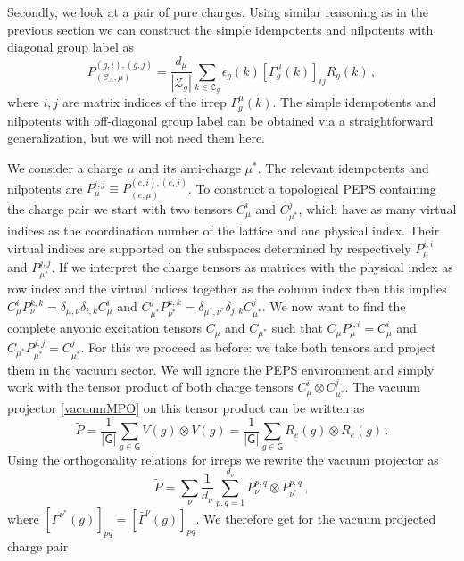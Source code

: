 \documentclass[12 pt]{article}
\begin{document}
Secondly, we look at a pair of pure charges. Using similar reasoning as in the previous section we can construct the simple idempotents and nilpotents with diagonal group label as
\begin{equation}
    P_{(\mathcal{C}_A,\mu)}^{(g,i),(g,j)} =  \frac{d_\mu}{|\mathcal{Z}_g|}\sum_{k\in\mathcal{Z}_g} \epsilon_g(k) [\Gamma^\mu_g(k)]_{ij}R_g(k)\, ,
\end{equation}
where $i,j$ are matrix indices of the irrep $\Gamma^\mu_g(k)$. The simple idempotents and nilpotents with off-diagonal group label can be obtained via a straightforward generalization, but we will not need them here.

We consider a charge $\mu$ and its anti-charge $\mu^*$. The relevant idempotents and nilpotents are $P_{\mu}^{i,j} \equiv P_{(e,\mu)}^{(e,i),(e,j)}$. To construct a topological PEPS containing the charge pair we start with two tensors $C^i_\mu$ and $C^j_{\mu^*}$, which have as many virtual indices as the coordination number of the lattice and one physical index. Their virtual indices are supported on the subspaces determined by respectively $P_\mu^{i,i}$ and $P_{\mu^*}^{j,j}$. If we interpret the charge tensors as matrices with the physical index as row index and the virtual indices together as the column index then this implies $C^i_\mu P^{k,k}_\nu = \delta_{\mu,\nu}\delta_{i,k}C^i_\mu$ and $C^j_{\mu^*} P^{k,k}_{\nu^*} = \delta_{\mu^*,\nu^*}\delta_{j,k} C^j_{\mu^*}$. We now want to find the complete anyonic excitation tensors $C_\mu$ and $C_{\mu^*}$ such that $C_\mu P_\mu^{i,i} = C_\mu^i$ and $C_{\mu^*}P_{\mu^*}^{j,j} = C^j_{\mu^*}$. For this we proceed as before: we take both tensors and project them in the vacuum sector. We will ignore the PEPS environment and simply work with the tensor product of both charge tensors $C_\mu^i\otimes C_{\mu^*}^j$. The vacuum projector \eqref{vacuumMPO} on this tensor product can be written as
\begin{equation}
    \tilde{P} = \frac{1}{|\mathsf{G}|}\sum_{g\in \mathsf{G}} V(g)\otimes V(g) = \frac{1}{|\mathsf{G}|}\sum_{g\in \mathsf{G}} R_e(g)\otimes R_e(g)\, .
\end{equation}
Using the orthogonality relations for irreps we rewrite the vacuum projector as
\begin{equation}
    \tilde{P} = \sum_{\nu}\frac{1}{d_\nu}\sum_{p,q=1}^{d_\nu}P^{p,q}_\nu\otimes P^{p,q}_{\nu^*}\, ,
\end{equation}
where $[\Gamma^{\nu^*}(g)]_{pq} = [\bar{\Gamma}^\nu(g)]_{pq}$. We therefore get for the vacuum projected charge pair
\end{document}
